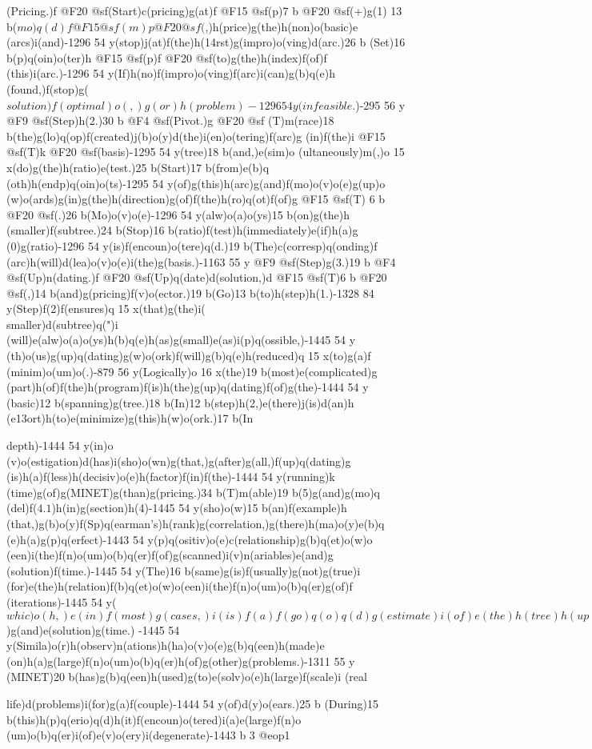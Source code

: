 {{{{{{{{(Pricing.)f @F20 @sf(Start)c(pricing)g(at)f @F15 @sf(p)7 b @F20 @sf(+)g(1)
13 b(\(mo)q(d)f @F15 @sf(m)p @F20 @sf(\),)h(price)g(the)h(non)o(basic)e
(arcs)i(and)-1296 54 y(stop)j(at)f(the)h(\014rst)g(impro)o(ving)d(arc.)26 b
(Set)16 b(p)q(oin)o(ter)h @F15 @sf(p)f @F20 @sf(to)g(the)h(index)f(of)f
(this)i(arc.)-1296 54 y(If)h(no)f(impro)o(ving)f(arc)i(can)g(b)q(e)h
(found,)f(stop)g(\(solution)f(optimal)o(,)g(or)h(problem)-1296 54 y
(infeasible\).)-295 56 y @F9 @sf(Step)h(2.)30 b @F4 @sf(Pivot.)g @F20 @sf
(T)m(race)18 b(the)g(lo)q(op)f(created)j(b)o(y)d(the)i(en)o(tering)f(arc)g
(in)f(the)i @F15 @sf(T)k @F20 @sf(basis)-1295 54 y(tree)18 b(and,)e(sim)o
(ultaneously)m(,)o 15 x(do)g(the)h(ratio)e(test.)25 b(Start)17 b(from)e(b)q
(oth)h(endp)q(oin)o(ts)-1295 54 y(of)g(this)h(arc)g(and)f(mo)o(v)o(e)g(up)o
(w)o(ards)g(in)g(the)h(direction)g(of)f(the)h(ro)q(ot)f(of)g @F15 @sf(T)
6 b @F20 @sf(.)26 b(Mo)o(v)o(e)-1296 54 y(alw)o(a)o(ys)15 b(on)g(the)h
(smaller)f(subtree.)24 b(Stop)16 b(ratio)f(test)h(immediately)e(if)h(a)g
(0)g(ratio)-1296 54 y(is)f(encoun)o(tere)q(d.)19 b(The)c(corresp)q(onding)f
(arc)h(will)d(lea)o(v)o(e)i(the)g(basis.)-1163 55 y @F9 @sf(Step)g(3.)19 b 
@F4 @sf(Up)n(dating.)f @F20 @sf(Up)q(date)d(solution,)d @F15 @sf(T)6 b 
@F20 @sf(,)14 b(and)g(pricing)f(v)o(ector.)19 b(Go)13 b(to)h(step)h(1.)-1328 
84 y(Step)f(2)f(ensures)q 15 x(that)g(the)i(\\smaller)d(subtree)q(")i
(will)e(alw)o(a)o(ys)h(b)q(e)h(as)g(small)e(as)i(p)q(ossible,)-1445 54 y
(th)o(us)g(up)q(dating)g(w)o(ork)f(will)g(b)q(e)h(reduced)q 15 x(to)g(a)f
(minim)o(um)o(.)-879 56 y(Logically)o 16 x(the)19 b(most)e(complicated)g
(part)h(of)f(the)h(program)f(is)h(the)g(up)q(dating)f(of)g(the)-1444 54 y
(basic)12 b(spanning)g(tree.)18 b(In)12 b(step)h(2,)e(there)j(is)d(an)h
(e\013ort)h(to)e(minimize)g(this)h(w)o(ork.)17 b(In{depth)-1444 54 y(in)o
(v)o(estigation)d(has)i(sho)o(wn)g(that,)g(after)g(all,)f(up)q(dating)g
(is)h(a)f(less)h(decisiv)o(e)h(factor)f(in)f(the)-1444 54 y(running)k
(time)g(of)g(MINET)g(than)g(pricing.)34 b(T)m(able)19 b(5)g(and)g(mo)q
(del)f(\(4.1\))h(in)g(section)h(4)-1445 54 y(sho)o(w)15 b(an)f(example)h
(that,)g(b)o(y)f(Sp)q(earman's)h(rank)g(correlation,)g(there)h(ma)o(y)e(b)q
(e)h(a)g(p)q(erfect)-1443 54 y(p)q(ositiv)o(e)c(relationship)g(b)q(et)o(w)o
(een)i(the)f(n)o(um)o(b)q(er)f(of)g(scanned)i(v)n(ariables)e(and)g
(solution)f(time.)-1445 54 y(The)16 b(same)g(is)f(usually)g(not)g(true)i
(for)e(the)h(relation)f(b)q(et)o(w)o(een)i(the)f(n)o(um)o(b)q(er)g(of)f
(iterations)-1445 54 y(\(whic)o(h,)e(in)f(most)g(cases,)i(is)f(a)f(go)q(o)q
(d)g(estimate)i(of)e(the)h(tree)h(up)q(dates\))g(and)e(solution)g(time.)
-1445 54 y(Simila)o(r)h(observ)n(ations)h(ha)o(v)o(e)g(b)q(een)h(made)e
(on)h(a)g(large)f(n)o(um)o(b)q(er)h(of)g(other)g(problems.)-1311 55 y
(MINET)20 b(has)g(b)q(een)h(used)g(to)e(solv)o(e)h(large)f(scale)i
(real{life)d(problems)i(for)g(a)f(couple)-1444 54 y(of)d(y)o(ears.)25 b
(During)15 b(this)h(p)q(erio)q(d)h(it)f(encoun)o(tered)i(a)e(large)f(n)o
(um)o(b)q(er)i(of)e(v)o(ery)i(degenerate)-1443 b
3 @eop1

}}}}}}}}}}
